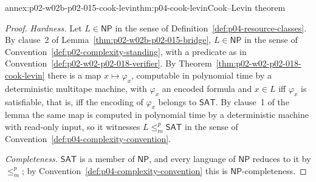 \begin{annexitem}{annex:p02-w02b-p02-015-cook-levin}{thm:p04-cook-levin}{Cook--Levin theorem}
\begin{proof}
\emph{Hardness.}  Let \(L\in\mathsf{NP}\) in the sense of
Definition~\ref{def:p04-resource-classes}.  By clause~2 of
Lemma~\ref{thm:p02-w02b-p02-015-bridge}, \(L\in\mathsf{NP}\) in the sense of
Convention~\ref{def:p02-complexity-standing}, with a predicate as in
Convention~\ref{def:p02-w02-p02-018-verifier}.  By
Theorem~\ref{thm:p02-w02-p02-018-cook-levin} there is a map
\(x\mapsto\varphi_x\), computable in polynomial time by a deterministic
multitape machine, with \(\varphi_x\) an encoded formula and \(x\in L\) iff
\(\varphi_x\) is satisfiable, that is, iff the encoding of \(\varphi_x\)
belongs to \(\mathsf{SAT}\).  By clause~1 of the lemma the same map is
computed in polynomial time by a deterministic machine with read-only input,
so it witnesses \(L\leq_m^p\mathsf{SAT}\) in the sense of
Convention~\ref{def:p04-complexity-convention}.

\emph{Completeness.}  \(\mathsf{SAT}\) is a member of \(\mathsf{NP}\), and
every language of \(\mathsf{NP}\) reduces to it by \(\leq_m^p\); by
Convention~\ref{def:p04-complexity-convention} this is
\(\mathsf{NP}\)-completeness.
\end{proof}
\end{annexitem}
